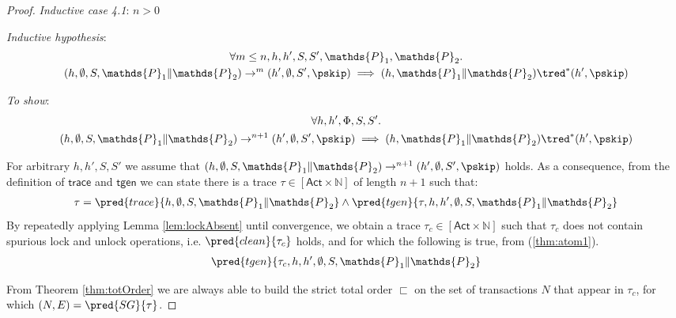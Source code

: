\begin{thm}
{\begin{proof}
\textit{Inductive case 4.1}: $n > 0$

\textit{Inductive hypothesis}:
\begin{gather*}
	\forall m \leq n, h, h', S, S', \mathds{P}_1, \mathds{P}_2 \ldotp \\
	(h, \emptyset, S, \mathds{P}_1 \| \mathds{P}_2) \rightarrow^m (h', \emptyset, S', \pskip)
	\implies
	(h, \mathds{P}_1 \| \mathds{P}_2) \tred^* (h', \pskip)
\end{gather*}

\textit{To show}:
\begin{gather*}
	\forall h, h', \Phi, S, S' \ldotp \\
	(h, \emptyset, S, \mathds{P}_1 \| \mathds{P}_2) \rightarrow^{n+1} (h', \emptyset, S', \pskip)
	\implies
	(h, \mathds{P}_1 \| \mathds{P}_2) \tred^* (h', \pskip)
\end{gather*}

\newpage 
For arbitrary $h, h', S, S'$ we assume that $(h, \emptyset, S, \mathds{P}_1 \| \mathds{P}_2) \rightarrow^{n+1} (h', \emptyset, S', \pskip)$ holds. As a consequence, from the definition of $\mathsf{trace}$ and $\mathsf{tgen}$ we can state there is a trace $\tau \in [\mathsf{Act} \times \mathds{N}]$ of length $n + 1$ such that:
\begin{gather}
	\label{thm:atom1}
	\tau = \pred{trace}{h, \emptyset, S, \mathds{P}_1 \| \mathds{P}_2} \land \pred{tgen}{\tau, h, h', \emptyset, S, \mathds{P}_1 \| \mathds{P}_2}
\end{gather}
By repeatedly applying Lemma \ref{lem:lockAbsent} until convergence, we obtain a trace $\tau_c \in [\mathsf{Act} \times \mathds{N}]$ such that $\tau_c$ does not contain spurious lock and unlock operations, i.e. $\pred{clean}{\tau_c}$ holds, and for which the following is true, from (\ref{thm:atom1}).
\begin{gather}
	\label{thm:atom2} \pred{tgen}{\tau_c, h, h', \emptyset, S, \mathds{P}_1 \| \mathds{P}_2}
\end{gather}

From Theorem \ref{thm:totOrder} we are always able to build the strict total order $\sqsubset$ on the set of transactions $N$ that appear in $\tau_c$, for which $(N, E) = \pred{SG}{\tau}$.


\end{proof}}
\end{thm}
